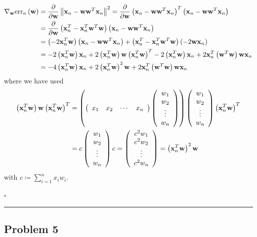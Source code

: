 \documentclass[12pt]{article}
\newcommand*{\QEDB}{\hfill\ensuremath{\square}}
\newcommand{\ParTh}[1]{\left(#1\right)}
\newcommand{\BF}[1]{{\bf#1}}
\newcommand{\VecAbsVal}[1]{\left\|#1\right\|}
\newcommand{\Matrix}[2]{\ParTh{\begin{array}{#1}#2\end{array}}}
\newcommand{\horrule}[1]{\rule{\linewidth}{#1}}
\begin{document}
\begin{align}
\nabla_{\BF{w}}\text{err}_n\ParTh{\BF{w}}&=\dfrac{\partial}{\partial\BF{w}}\VecAbsVal{\BF{x}_n-\BF{w}\BF{w}^T\BF{x}_n}^2=\dfrac{\partial}{\partial\BF{w}}\ParTh{\BF{x}_n-\BF{w}\BF{w}^T\BF{x}_n}^T\ParTh{\BF{x}_n-\BF{w}\BF{w}^T\BF{x}_n}\\
&=\dfrac{\partial}{\partial\BF{w}}\ParTh{\BF{x}^T_n-\BF{x}^T_n\BF{w}^T\BF{w}}\ParTh{\BF{x}_n-\BF{w}\BF{w}^T\BF{x}_n}\\
&=\ParTh{-2\BF{x}^T_n\BF{w}}\ParTh{\BF{x}_n-\BF{w}\BF{w}^T\BF{x}_n}+\ParTh{\BF{x}^T_n-\BF{x}^T_n\BF{w}^T\BF{w}}\ParTh{-2\BF{w}\BF{x}_n}\\
&=-2\ParTh{\BF{x}^T_n\BF{w}}\BF{x}_n+2\ParTh{\BF{x}^T_n\BF{w}}\BF{w}\ParTh{\BF{x}^T_n\BF{w}}^T-2\ParTh{\BF{x}^T_n\BF{w}}\BF{x}_n+2\BF{x}^T_n\ParTh{\BF{w}^T\BF{w}}\BF{w}\BF{x}_n\\
&=-4\ParTh{\BF{x}^T_n\BF{w}}\BF{x}_n+2\ParTh{\BF{x}^T_n\BF{w}}^2\BF{w}+2\BF{x}^T_n\ParTh{\BF{w}^T\BF{w}}\BF{w}\BF{x}_n
\end{align}
where we have used
\begin{align}
\ParTh{\BF{x}^T_n\BF{w}}\BF{w}\ParTh{\BF{x}^T_n\BF{w}}^T&=\ParTh{\Matrix{cccc}{x_1&x_2&\cdots&x_n}\Matrix{c}{w_{1}\\w_{2}\\\vdots\\w_{n}}}\Matrix{c}{w_{1}\\w_{2}\\\vdots\\w_{n}}\ParTh{\BF{x}^T_n\BF{w}}^T\\
&=c\Matrix{c}{w_{1}\\w_{2}\\\vdots\\w_{n}}c=\Matrix{c}{c^2w_{1}\\c^2w_{2}\\\vdots\\c^2w_{n}}=\ParTh{\BF{x}^T_n\BF{w}}^2\BF{w}
\end{align}
with $c\coloneqq\sum_{i=1}^{n}x_iw_i$.

\QEDB

\horrule{0.5pt}

\subsection*{Problem 5}
\end{document}
